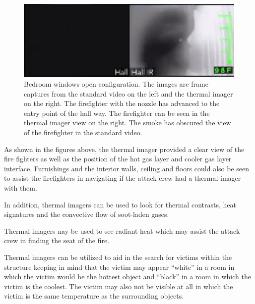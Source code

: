 \documentclass[12pt,oneside]{book}
\begin{document}
\begin{figure}[H]
\centering
\includegraphics[width=1.0\textwidth]{../0_Images/Tactical_Considerations/Thermal_Imager/Exp14Hallpair.png}
\caption[Thermal Imager F]{Bedroom windows open configuration. The images are frame captures from the standard video on the left and the thermal imager on the right. The firefighter with the nozzle has advanced to the entry point of the hall way. The firefighter can be seen in the thermal imager view on the right. The smoke has obscured the view of the firefighter in the standard video.}
\label{fig:thermal_imager_f}
\end{figure}

As shown in the figures above, the thermal imager provided a clear view of the fire fighters as well as the position of the hot gas layer and cooler gas layer interface. Furnishings and the interior walls, ceiling and floors could also be seen to assist the firefighters in navigating if the attack crew had a thermal imager with them.  

In addition, thermal imagers can be used to look for thermal contrasts, heat signatures and the convective flow of soot-laden gases.  

Thermal imagers nay be used to see radiant heat which may assist the attack crew in finding the seat of the fire.

Thermal imagers can be utilized to aid in the search for victims within the structure keeping in mind that the victim may appear ``white'' in a room in which the victim would be the hottest object and ``black'' in a room in which the victim is the coolest. The victim may also not be visible at all in which the victim is the same temperature as the surrounding objects.
\end{document}
